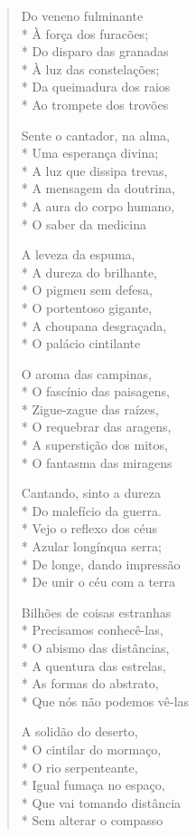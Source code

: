 \begin{verse}
Do veneno fulminante\\*
À força dos furacões;\\*
Do disparo das granadas\\*
À luz das constelações;\\*
Da queimadura dos raios\\*
Ao trompete dos trovões

Sente o cantador, na alma,\\*
Uma esperança divina;\\*
A luz que dissipa trevas,\\*
A mensagem da doutrina,\\*
A aura do corpo humano,\\*
O saber da medicina

A leveza da espuma,\\*
A dureza do brilhante,\\*
O pigmeu sem defesa,\\*
O portentoso gigante,\\*
A choupana desgraçada,\\*
O palácio cintilante

O aroma das campinas,\\*
O fascínio das paisagens,\\*
Zigue-zague das raízes,\\*
O requebrar das aragens,\\*
A superstição dos mitos,\\*
O fantasma das miragens

Cantando, sinto a dureza\\*
Do malefício da guerra.\\*
Vejo o reflexo dos céus\\*
Azular longínqua serra;\\*
De longe, dando impressão\\*
De unir o céu com a terra

Bilhões de coisas estranhas\\*
Precisamos conhecê-las,\\*
O abismo das distâncias,\\*
A quentura das estrelas,\\*
As formas do abstrato,\\*
Que nós não podemos vê-las

A solidão do deserto,\\*
O cintilar do mormaço,\\*
O rio serpenteante,\\*
Igual fumaça no espaço,\\*
Que vai tomando distância\\*
Sem alterar o compasso


\end{verse}
